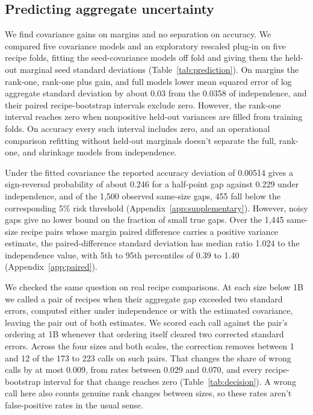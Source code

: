 \documentclass{article}
\begin{document}
\subsection{Predicting aggregate uncertainty}
\label{sec:prediction}
We find covariance gains on margins and no separation on accuracy. We compared five covariance models and an exploratory rescaled plug-in on five recipe folds, fitting the seed-covariance models off fold and giving them the held-out marginal seed standard deviations (Table~\ref{tab:prediction}). On margins the rank-one, rank-one plus gain, and full models lower mean squared error of log aggregate standard deviation by about 0.03 from the 0.0358 of independence, and their paired recipe-bootstrap intervals exclude zero. However, the rank-one interval reaches zero when nonpositive held-out variances are filled from training folds. On accuracy every such interval includes zero, and an operational comparison refitting without held-out marginals doesn't separate the full, rank-one, and shrinkage models from independence.

Under the fitted covariance the reported accuracy deviation of 0.00514 gives a sign-reversal probability of about 0.246 for a half-point gap against 0.229 under independence, and of the 1,500 observed same-size gaps, 455 fall below the corresponding 5\% risk threshold (Appendix~\ref{app:supplementary}). However, noisy gaps give no lower bound on the fraction of small true gaps. Over the 1,445 same-size recipe pairs whose margin paired difference carries a positive variance estimate, the paired-difference standard deviation has median ratio 1.024 to the independence value, with 5th to 95th percentiles of 0.39 to 1.40 (Appendix~\ref{app:paired}).

We checked the same question on real recipe comparisons. At each size below 1B we called a pair of recipes when their aggregate gap exceeded two standard errors, computed either under independence or with the estimated covariance, leaving the pair out of both estimates. We scored each call against the pair's ordering at 1B whenever that ordering itself cleared two corrected standard errors. Across the four sizes and both scales, the correction removes between 1 and 12 of the 173 to 223 calls on such pairs. That changes the share of wrong calls by at most 0.009, from rates between 0.029 and 0.070, and every recipe-bootstrap interval for that change reaches zero (Table~\ref{tab:decision}). A wrong call here also counts genuine rank changes between sizes, so these rates aren't false-positive rates in the usual sense.
\end{document}
